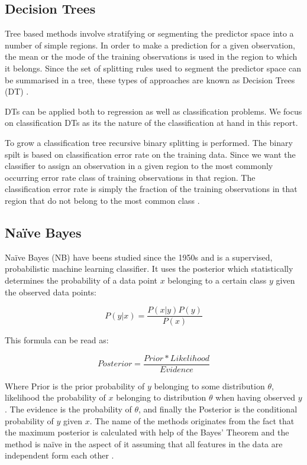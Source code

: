 \subsection{Decision Trees}

Tree based methods involve stratifying or segmenting the predictor space into a number of simple regions. In order to make a prediction for a given observation, the mean or the mode of the training observations is used in the region to which it belongs. Since the set of splitting rules used
to segment the predictor space can be summarised in a tree, these types of approaches are known as Decision Trees (DT) \parencite{James:2014}.

DTs can be applied both to regression as well as classification problems. We focus on classification DTs as its the nature of the classification at hand in this report.

To grow a classification tree recursive
binary splitting is performed. The binary spilt is based on classification error rate on the training data. Since we want the classifier to assign an observation in a given region to the most commonly occurring error rate class of training observations in that region. The classification error rate is simply the fraction of the training observations in that region that do not belong to the most common class \parencite{James:2014}.

\subsection{Naïve Bayes}

Naïve Bayes (NB) have beens studied since the 1950s and is a supervised, probabilistic machine learning classifier. It uses the posterior which statistically determines the probability of a data point $x$ belonging to a certain class $y$ given the observed data points:

\[
P(y|x) = \frac{P(x|y)P(y)}{P(x)}
\]

This formula can be read as:

\[
Posterior = \frac{Prior * Likelihood}{Evidence}
\]

Where Prior is the prior probability of $y$ belonging to some distribution $\theta$, likelihood the probability of $x$ belonging to distribution $\theta$ when having observed $y$. The evidence is the probability of $\theta$, and finally the Posterior is the conditional probability of $y$ given $x$. The name of the methods originates from the fact that the maximum posterior is calculated with help of the Bayes' Theorem and the method is naïve in the aspect of it assuming that all features in the data are independent form each other \parencite{george2012}.


